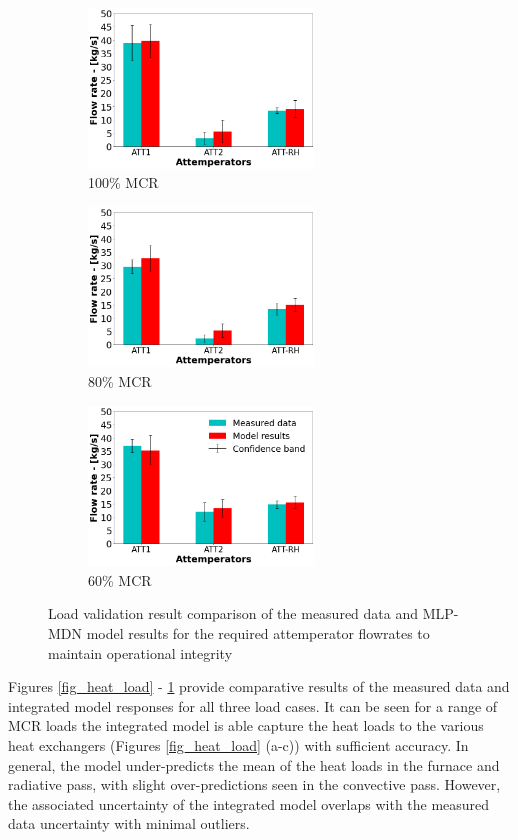 \documentclass[a4paper,fleqn]{cas-dc}
\begin{document}
\begin{figure}
\centering
\begin{subfigure}{0.33\textwidth}
    \includegraphics[width=\linewidth, height = 4.25cm]{100_CASE_ATTEMP}
    \caption{100\% MCR}
\end{subfigure}\hfill %
\begin{subfigure}{0.33\textwidth}
    \includegraphics[width=\linewidth, height = 4.25cm]{80_CASE_ATTEMP}
    \caption{80\% MCR}
\end{subfigure}\hfill
\begin{subfigure}{0.33\textwidth}
    \includegraphics[width=\linewidth, height = 4.25cm]{60_CASE_ATTEMP}
    \caption{60\% MCR}
\end{subfigure}
\caption{Load validation result comparison of the measured data and MLP-MDN model results for the required attemperator flowrates to maintain operational integrity}
\label{fig_attemp}
\end{figure}

Figures \ref{fig_heat_load} - \ref{fig_attemp} provide comparative results of the measured data and integrated model responses for all three load cases. It can be seen for a range of MCR loads the integrated model is able capture the heat loads to the various heat exchangers (Figures \ref{fig_heat_load} (a-c)) with sufficient accuracy. In general, the model under-predicts the mean of the heat loads in the furnace and radiative pass, with slight over-predictions seen in the convective pass. However, the associated uncertainty of the integrated model overlaps with the measured data uncertainty with minimal outliers.\\ 
\end{document}
